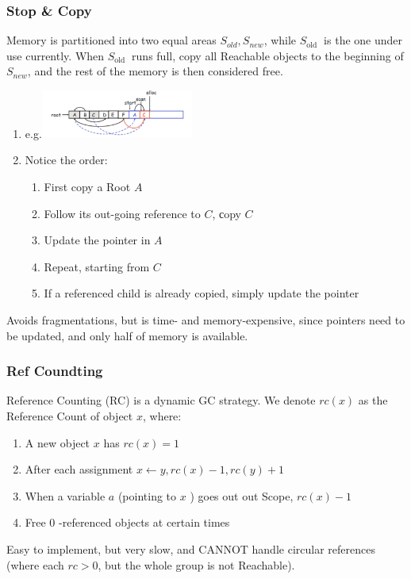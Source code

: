 \documentclass[a4paper]{exam}
\theoremstyle{definition}
\begin{document}
\subsubsection{Stop \& Copy}
Memory is partitioned into two equal areas $S_{o l d}, S_{n e w}$, while $S_{\text {old }}$ is the one under use currently. When $S_{\text {old }}$ runs full, copy all Reachable objects to the beginning of $S_{n e w}$, and the rest of the memory is then considered free.
\begin{enumerate}
    \item e.g.\includegraphics[width=5cm]{img/stop_and_copy.png}
    \item Notice the order:
    \begin{enumerate}
        \item First copy a Root $A$
 \item Follow its out-going reference to $C$, сopy $C$
  \item Update the pointer in $A$
 \item Repeat, starting from $C$
 \item If a referenced child is already copied, simply update the pointer
    \end{enumerate}
 
\end{enumerate}
Avoids fragmentations, but is time- and memory-expensive, since pointers need to be updated, and only half of memory is available.
\subsubsection{Ref Coundting}
Reference Counting (RC) is a dynamic GC strategy. We denote $r c(x)$ as the Reference Count of object $x$, where:
\begin{enumerate}
    \item A new object $x$ has $r c(x)=1$
\item After each assignment $x \leftarrow y, r c(x)-1, r c(y)+1$
\item When a variable $a$ (pointing to $x$ ) goes out out Scope, $r c(x)-1$
\item Free 0 -referenced objects at certain times
\end{enumerate}
Easy to implement, but very slow, and CANNOT handle circular references (where each $r c>0$, but the whole group is not Reachable).
\end{document}
